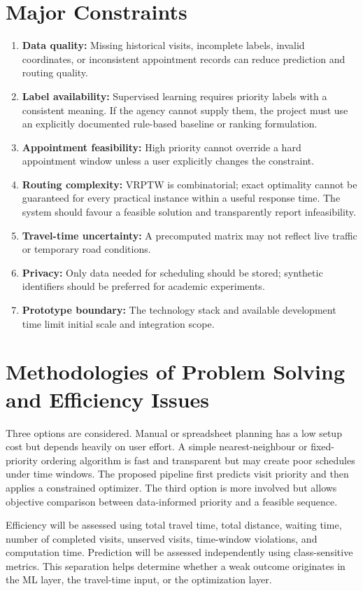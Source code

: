 \documentclass[12pt,a4paper,oneside]{report}
\begin{document}
\section{Major Constraints}
\begin{enumerate}[leftmargin=1.2cm]
\item \textbf{Data quality:} Missing historical visits, incomplete labels, invalid coordinates, or inconsistent appointment records can reduce prediction and routing quality.
\item \textbf{Label availability:} Supervised learning requires priority labels with a consistent meaning. If the agency cannot supply them, the project must use an explicitly documented rule-based baseline or ranking formulation.
\item \textbf{Appointment feasibility:} High priority cannot override a hard appointment window unless a user explicitly changes the constraint.
\item \textbf{Routing complexity:} VRPTW is combinatorial; exact optimality cannot be guaranteed for every practical instance within a useful response time. The system should favour a feasible solution and transparently report infeasibility.
\item \textbf{Travel-time uncertainty:} A precomputed matrix may not reflect live traffic or temporary road conditions.
\item \textbf{Privacy:} Only data needed for scheduling should be stored; synthetic identifiers should be preferred for academic experiments.
\item \textbf{Prototype boundary:} The technology stack and available development time limit initial scale and integration scope.
\end{enumerate}

\section{Methodologies of Problem Solving and Efficiency Issues}
Three options are considered. Manual or spreadsheet planning has a low setup cost but depends heavily on user effort. A simple nearest-neighbour or fixed-priority ordering algorithm is fast and transparent but may create poor schedules under time windows. The proposed pipeline first predicts visit priority and then applies a constrained optimizer. The third option is more involved but allows objective comparison between data-informed priority and a feasible sequence.

Efficiency will be assessed using total travel time, total distance, waiting time, number of completed visits, unserved visits, time-window violations, and computation time. Prediction will be assessed independently using class-sensitive metrics. This separation helps determine whether a weak outcome originates in the ML layer, the travel-time input, or the optimization layer.
\end{document}
